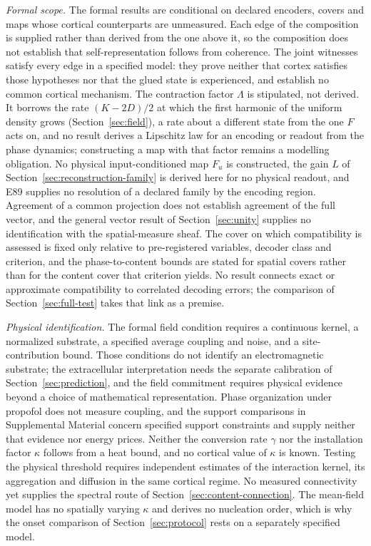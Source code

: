 \documentclass[12pt]{article}
\begin{document}
\emph{Formal scope.} The formal results are conditional on declared encoders,
covers and maps whose cortical counterparts are unmeasured. Each edge of the
composition is supplied rather than derived from the one above it, so the
composition does not establish that self-representation follows from
coherence. The joint witnesses satisfy every edge in a specified model: they
prove neither that cortex satisfies those hypotheses nor that the glued state
is experienced, and establish no common cortical mechanism. The contraction
factor $\Lambda$ is stipulated, not derived. It borrows the rate $(K-2D)/2$ at
which the first harmonic of the uniform density grows
(Section~\ref{sec:field}), a rate about a different state from the one $F$
acts on, and no result derives a Lipschitz law for an encoding or readout from
the phase dynamics; constructing a map with that factor remains a modelling
obligation. No physical input-conditioned map $F_u$ is constructed, the gain
$L$ of Section~\ref{sec:reconstruction-family} is derived here for no physical
readout, and E89 supplies no resolution of a declared family by the encoding
region. Agreement of a common projection does not establish agreement of the
full vector, and the general vector result of Section~\ref{sec:unity} supplies
no identification with the spatial-measure sheaf. The cover on which
compatibility is assessed is fixed only relative to pre-registered variables,
decoder class and criterion, and the phase-to-content bounds are stated for
spatial covers rather than for the content cover that criterion yields. No
result connects exact or approximate compatibility to correlated decoding
errors; the comparison of Section~\ref{sec:full-test} takes that link as a
premise.

\emph{Physical identification.} The formal field condition requires a
continuous kernel, a normalized substrate, a specified average coupling and
noise, and a site-contribution bound. Those conditions do not identify an
electromagnetic substrate; the extracellular interpretation needs the separate
calibration of Section~\ref{sec:prediction}, and the field commitment requires
physical evidence beyond a choice of mathematical representation. Phase
organization under propofol does not measure coupling, and the support
comparisons in Supplemental Material concern specified support constraints and
supply neither that evidence nor energy prices. Neither the conversion rate
$\gamma$ nor the installation factor $\kappa$ follows from a heat bound, and no
cortical value of $\kappa$ is known. Testing the physical threshold requires
independent estimates of the interaction kernel, its aggregation and diffusion
in the same cortical regime. No measured connectivity yet supplies the
spectral route of Section~\ref{sec:content-connection}. The mean-field model
has no spatially varying $\kappa$ and derives no nucleation order, which is
why the onset comparison of Section~\ref{sec:protocol} rests on a separately
specified model.
\end{document}
